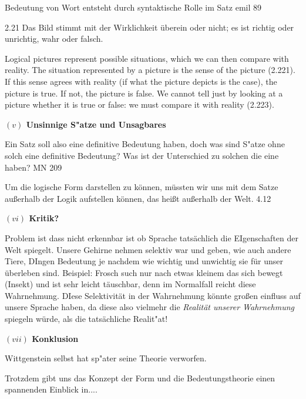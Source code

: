 \documentclass[a4paper, emulatestandardclasses, 12pt]{scrartcl}
\begin{document}
\begin{onehalfspace}
Bedeutung von Wort entsteht durch syntaktische Rolle im Satz emil 89

2.21
Das Bild stimmt mit der Wirklichkeit überein oder nicht; es ist richtig oder unrichtig, wahr oder falsch.

Logical pictures represent possible situations, which we can then compare with reality. The situation represented by a picture is the sense of the picture (2.221). If this sense agrees with reality (if what the picture depicts is the case), the picture is true. If not, the picture is false. We cannot tell just by looking at a picture whether it is true or false: we must compare it with reality (2.223).



\vspace{5mm}
\noindent\textbf{$(v)$ Unsinnige S"atze und Unsagbares}	

Ein Satz soll also eine definitive Bedeutung haben, doch was sind S"atze ohne solch eine definitive Bedeutung? Was ist der Unterschied zu solchen die eine haben? MN 209

Um die logische Form darstellen zu können, müssten wir uns mit dem Satze außerhalb der Logik aufstellen können, das heißt außerhalb der Welt. 4.12

\vspace{5mm}
\noindent\textbf{$(vi)$ Kritik?}	

Problem ist dass nicht erkennbar ist ob Sprache tatsächlich die EIgenschaften der Welt spiegelt. Unsere Gehirne nehmen selektiv war und geben, wie auch andere Tiere, DIngen Bedeutung je nachdem wie wichtig und unwichtig sie für unser überleben sind. Beispiel: Frosch such nur nach etwas kleinem das sich bewegt (Insekt) und ist sehr leicht täuschbar, denn im Normalfall reicht diese Wahrnehmung. DIese Selektivität in der Wahrnehmung könnte großen einfluss auf unsere Sprache haben, da diese also vielmehr die \emph{Realität unserer Wahrnehmung} spiegeln würde, als die tatsächliche Realit"at!

\vspace{5mm}
\noindent\textbf{$(vii)$ Konklusion}

Wittgenstein selbst hat sp"ater seine Theorie verworfen.

Trotzdem gibt uns das Konzept der Form und die Bedeutungstheorie einen spannenden Einblick in....

\end{onehalfspace}
\nocite{*}

\end{document}
